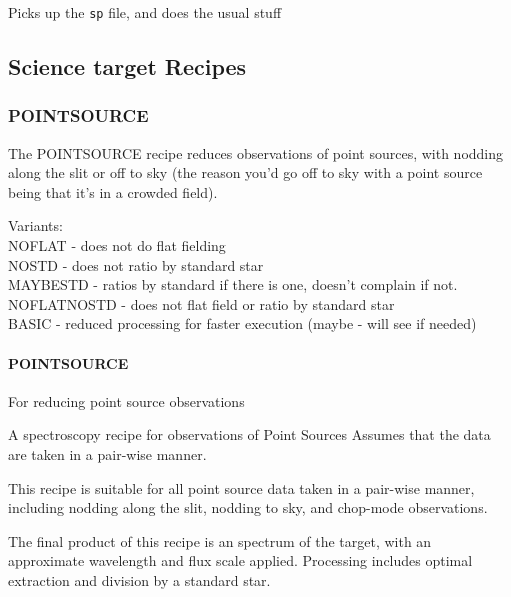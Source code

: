 \documentclass[twoside,11pt]{article}
\renewcommand{\_}{\texttt{\symbol{95}}}
\begin{document}
\mbox{}


Picks up the \texttt{\_sp} file, and does the usual stuff


\subsection{Science target Recipes}

\subsubsection{POINT\_SOURCE}

The POINT\_SOURCE recipe reduces observations of point sources, with
nodding along the slit or off to sky (the reason you'd go off to sky
with a point source being that it's in a crowded field).


Variants: \\
\_NOFLAT - does not do flat fielding \\
\_NOSTD - does not ratio by standard star \\
\_MAYBESTD - ratios by standard if there is one, doesn't complain if not. \\
\_NOFLAT\_NOSTD - does not flat field or ratio by standard star \\
\_BASIC - reduced processing for faster execution (maybe - will see if needed) \\

\paragraph{POINT\_SOURCE\label{POINT_SOURCE}}


For reducing point source observations


\mbox{}


A spectroscopy recipe for observations of Point Sources
Assumes that the data are taken in a pair-wise manner.



This recipe is suitable for all point source data taken in a pair-wise
manner, including nodding along the slit, nodding to sky, and
chop-mode observations.



The final product of this recipe is an spectrum of the target, with an
approximate wavelength and flux scale applied. Processing includes
optimal extraction and division by a standard star.
\end{document}
